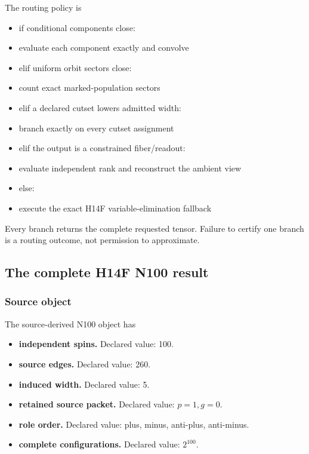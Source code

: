 The routing policy is

\begin{itemize}
\tightlist
\item
  if conditional components close:
\item
  evaluate each component exactly and convolve
\item
  elif uniform orbit sectors close:
\item
  count exact marked-population sectors
\item
  elif a declared cutset lowers admitted width:
\item
  branch exactly on every cutset assignment
\item
  elif the output is a constrained fiber/readout:
\item
  evaluate independent rank and reconstruct the ambient view
\item
  else:
\item
  execute the exact H14F variable-elimination fallback
\end{itemize}

Every branch returns the complete requested tensor. Failure to certify
one branch is a routing outcome, not permission to approximate.

\subsection{The complete H14F N100
result}\label{viii-ch01-the-complete-h14f-n100-result}

\subsubsection{Source object}\label{viii-ch01-source-object}

The source-derived N100 object has

\begin{itemize}
\tightlist
\item
  \textbf{independent spins.} Declared value: 100.
\item
  \textbf{source edges.} Declared value: 260.
\item
  \textbf{induced width.} Declared value: 5.
\item
  \textbf{retained source packet.} Declared value: \(p=1,g=0\).
\item
  \textbf{role order.} Declared value: plus, minus, anti-plus,
  anti-minus.
\item
  \textbf{complete configurations.} Declared value: \(2^{100}\).
\end{itemize}

